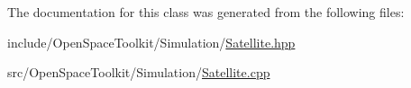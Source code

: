 The documentation for this class was generated from the following files\+:\begin{DoxyCompactItemize}
\item 
include/\+Open\+Space\+Toolkit/\+Simulation/\hyperlink{_satellite_8hpp}{Satellite.\+hpp}\item 
src/\+Open\+Space\+Toolkit/\+Simulation/\hyperlink{_satellite_8cpp}{Satellite.\+cpp}\end{DoxyCompactItemize}
